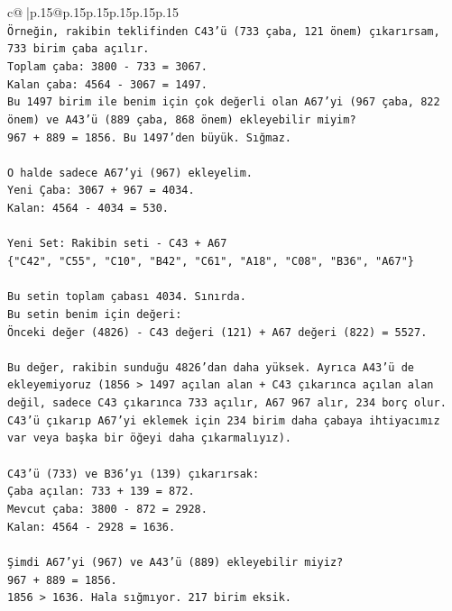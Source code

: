 \documentclass{article}
\begin{document}
{\begin{supertabular}{c@{$\;$}|p{.15\linewidth}@{}p{.15\linewidth}p{.15\linewidth}p{.15\linewidth}p{.15\linewidth}p{.15\linewidth}}
{{{\\ 
\texttt{Örneğin, rakibin teklifinden C43'ü (733 çaba, 121 önem) çıkarırsam, 733 birim çaba açılır.} \\
\texttt{Toplam çaba: 3800 {-} 733 = 3067.} \\
\texttt{Kalan çaba: 4564 {-} 3067 = 1497.} \\
\texttt{Bu 1497 birim ile benim için çok değerli olan A67'yi (967 çaba, 822 önem) ve A43'ü (889 çaba, 868 önem) ekleyebilir miyim?} \\
\texttt{967 + 889 = 1856. Bu 1497'den büyük. Sığmaz.} \\
\\ 
\texttt{O halde sadece A67'yi (967) ekleyelim.} \\
\texttt{Yeni Çaba: 3067 + 967 = 4034.} \\
\texttt{Kalan: 4564 {-} 4034 = 530.} \\
\\ 
\texttt{Yeni Set: Rakibin seti {-} C43 + A67} \\
\texttt{\{"C42", "C55", "C10", "B42", "C61", "A18", "C08", "B36", "A67"\}} \\
\\ 
\texttt{Bu setin toplam çabası 4034. Sınırda.} \\
\texttt{Bu setin benim için değeri:} \\
\texttt{Önceki değer (4826) {-} C43 değeri (121) + A67 değeri (822) = 5527.} \\
\\ 
\texttt{Bu değer, rakibin sunduğu 4826'dan daha yüksek. Ayrıca A43'ü de ekleyemiyoruz (1856 > 1497 açılan alan + C43 çıkarınca açılan alan değil, sadece C43 çıkarınca 733 açılır, A67 967 alır, 234 borç olur. C43'ü çıkarıp A67'yi eklemek için 234 birim daha çabaya ihtiyacımız var veya başka bir öğeyi daha çıkarmalıyız).} \\
\\ 
\texttt{C43'ü (733) ve B36'yı (139) çıkarırsak:} \\
\texttt{Çaba açılan: 733 + 139 = 872.} \\
\texttt{Mevcut çaba: 3800 {-} 872 = 2928.} \\
\texttt{Kalan: 4564 {-} 2928 = 1636.} \\
\\ 
\texttt{Şimdi A67'yi (967) ve A43'ü (889) ekleyebilir miyiz?} \\
\texttt{967 + 889 = 1856.} \\
\texttt{1856 > 1636. Hala sığmıyor. 217 birim eksik.} \\
}}}
\end{supertabular}}
\end{document}
